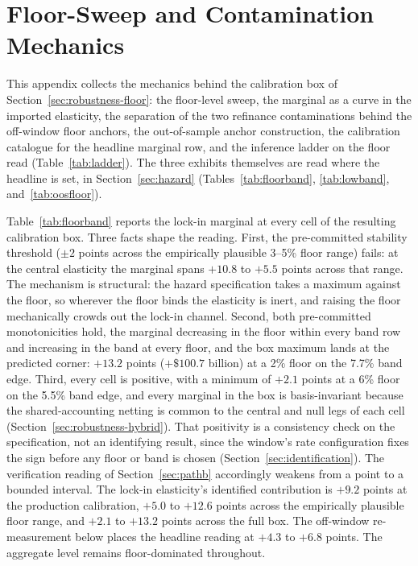 \documentclass[12pt]{article}
\begin{document}
\nocite{cfpb_atr,frbny_soma,fred_actliscou,fred_wshomcb,fred_dspic96,fred_umcsent}

\section{Floor-Sweep and Contamination Mechanics}\label{app:floormech}

This appendix collects the mechanics behind the calibration box of Section~\ref{sec:robustness-floor}: the floor-level sweep, the marginal as a curve in the imported elasticity, the separation of the two refinance contaminations behind the off-window floor anchors, the out-of-sample anchor construction, the calibration catalogue for the headline marginal row, and the inference ladder on the floor read (Table~\ref{tab:ladder}). The three exhibits themselves are read where the headline is set, in Section~\ref{sec:hazard} (Tables~\ref{tab:floorband}, \ref{tab:lowband}, and~\ref{tab:oosfloor}).

Table~\ref{tab:floorband} reports the lock-in marginal at every cell of the resulting calibration box. Three facts shape the reading. First, the pre-committed stability threshold ($\pm 2$ points across the empirically plausible 3--5\% floor range) fails: at the central elasticity the marginal spans $+10.8$ to $+5.5$ points across that range. The mechanism is structural: the hazard specification takes a maximum against the floor, so wherever the floor binds the elasticity is inert, and raising the floor mechanically crowds out the lock-in channel. Second, both pre-committed monotonicities hold, the marginal decreasing in the floor within every band row and increasing in the band at every floor, and the box maximum lands at the predicted corner: $+13.2$ points ($+\$100.7$ billion) at a 2\% floor on the 7.7\% band edge. Third, every cell is positive, with a minimum of $+2.1$ points at a 6\% floor on the 5.5\% band edge, and every marginal in the box is basis-invariant because the shared-accounting netting is common to the central and null legs of each cell (Section~\ref{sec:robustness-hybrid}). That positivity is a consistency check on the specification, not an identifying result, since the window's rate configuration fixes the sign before any floor or band is chosen (Section~\ref{sec:identification}). The verification reading of Section~\ref{sec:pathb} accordingly weakens from a point to a bounded interval. The lock-in elasticity's identified contribution is $+9.2$ points at the production calibration, $+5.0$ to $+12.6$ points across the empirically plausible floor range, and $+2.1$ to $+13.2$ points across the full box. The off-window re-measurement below places the headline reading at $+4.3$ to $+6.8$ points. The aggregate level remains floor-dominated throughout.
\end{document}
